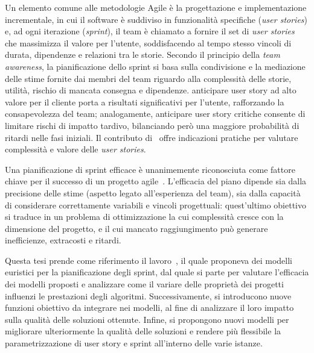 \documentclass[12pt,a4paper,openright,twoside]{book}
\begin{document}
\vspace{1em}

Un elemento comune alle metodologie Agile \`e la progettazione e implementazione incrementale, in cui il software \`e suddiviso in funzionalit\`a specifiche (\emph{user stories}) e, ad ogni iterazione (\emph{sprint}), il team \`e chiamato a fornire il set di \emph{user stories} che massimizza il valore per l'utente, soddisfacendo al tempo stesso vincoli di durata, dipendenze e relazioni tra le storie. Secondo il principio della \emph{team awareness}, la pianificazione dello sprint si basa sulla condivisione e la mediazione delle stime fornite dai membri del team riguardo alla complessit\`a delle storie, utilit\`a, rischio di mancata consegna e dipendenze. anticipare user story ad alto valore per il cliente porta a risultati significativi per l'utente, rafforzando la consapevolezza del team; analogamente, anticipare user story critiche consente di limitare rischi di impatto tardivo, bilanciando per\`o una maggiore probabilit\`a di ritardi nelle fasi iniziali. Il contributo di~\cite{C04} offre indicazioni pratiche per valutare complessit\`a e valore delle \emph{user stories}.

\vspace{1em}

Una pianificazione di sprint efficace \`e unanimemente riconosciuta come fattore chiave per il successo di un progetto agile~\cite{cohn2005agile}. L'efficacia del piano dipende sia dalla precisione delle stime (aspetto legato all'esperienza del team), sia dalla capacit\`a di considerare correttamente variabili e vincoli progettuali: quest'ultimo obiettivo si traduce in un problema di ottimizzazione la cui complessit\`a cresce con la dimensione del progetto, e il cui mancato raggiungimento pu\`o generare inefficienze, extracosti e ritardi.

\vspace{1em}

Questa tesi prende come riferimento il lavoro~\cite{BOSCHETTI2014116}, il quale proponeva dei modelli euristici per la pianificazione degli sprint, dal quale si parte per valutare l'efficacia dei modelli proposti e analizzare come il variare delle propriet\`a dei progetti influenzi le prestazioni degli algoritmi. Successivamente, si introducono nuove funzioni obiettivo da integrare nei modelli, al fine di analizzare il loro impatto sulla qualit\`a delle soluzioni ottenute. Infine, si propongono nuovi modelli per migliorare ulteriormente la qualit\`a delle soluzioni e rendere pi\`u flessibile la parametrizzazione di user story e sprint all'interno delle varie istanze.
\end{document}
